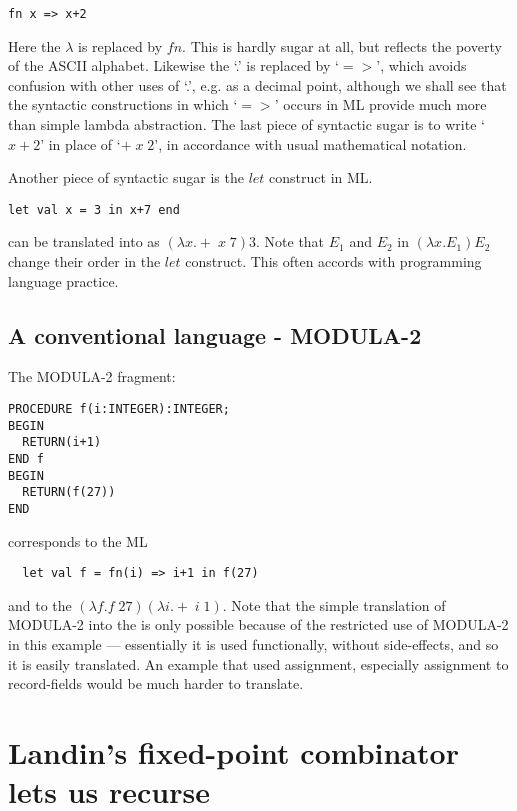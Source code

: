 \begin{verbatim}
fn x => x+2
\end{verbatim}

Here the $\lambda$ is replaced  by $fn$. This is  hardly sugar at all,  but
reflects the poverty of the ASCII alphabet. Likewise the `.' is replaced by
`$=>$', which avoids confusion  with other uses of  `.', e.g. as a  decimal
point, although  we shall  see that  the syntactic  constructions in  which
`$=>$' occurs in ML provide much  more than simple lambda abstraction.  The
last  piece  of  syntactic   sugar  is  to  write   `$x+2$'  in  place   of
`$+\;x\;2$', in accordance with usual mathematical notation.

Another piece of syntactic sugar is the $let$ construct in ML.
\begin{verbatim}
let val x = 3 in x+7 end
\end{verbatim}
can be translated into \LC as $(\lambda x. +\; x\; 7)3$. Note that
$E_1$ and $E_2$ in $(\lambda x. E_1) E_2$ change their order in the $let$
construct. This often accords with programming language practice.

\subsection{A conventional language - MODULA-2}

The MODULA-2 fragment:

\begin{verbatim}
PROCEDURE f(i:INTEGER):INTEGER;
BEGIN
  RETURN(i+1)
END f
BEGIN
  RETURN(f(27))
END
\end{verbatim}

corresponds to the ML

\begin{verbatim}
  let val f = fn(i) => i+1 in f(27)
\end{verbatim}


and to the \LC $(\lambda f. f\;  27) (\lambda i. +\; i\; 1)$. Note  that
the simple translation of MODULA-2 into the \LC is only possible because of
the restricted use of MODULA-2 in  this example --- essentially it is  used
functionally, without  side-effects, and  so it  is easily  translated.  An
example that used assignment, especially assignment to record-fields  would
be much harder to translate.

\section {Landin's fixed-point combinator lets us recurse}

